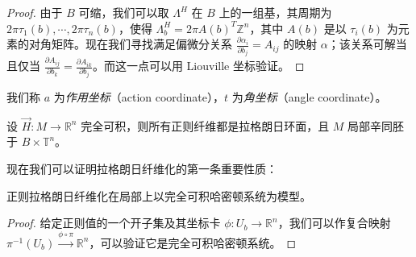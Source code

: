 \begin{proof}
由于 $B$ 可缩，我们可以取 $\Lambda^H$ 在 $B$ 上的一组基，其周期为 $2\pi\tau_1 (b),\dotsb, 2\pi\tau_n (b)$，使得 $\Lambda_b^H =2\pi A(b)^T\mathbb{Z}^n$，其中 $A(b)$ 是以 $\tau_i (b)$ 为元素的对角矩阵。现在我们寻找满足偏微分关系 $\displaystyle\frac{\partial\alpha_i}{\partial b_j}=A_{ij}$ 的映射 $\alpha$；该关系可解当且仅当 $\displaystyle\frac{\partial A_{ij}}{\partial b_k}=\frac{\partial A_{ik}}{\partial b_j}$。而这一点可以用 Liouville 坐标验证。
\end{proof}


我们称 $a$ 为\emph{作用坐标}（action coordinate），$t$ 为\emph{角坐标}（angle coordinate）。


\begin{corollary*}
设 $\vec{H}\colon M\to\mathbb{R}^n$ 完全可积，则所有正则纤维都是拉格朗日环面，且 $M$ 局部辛同胚于 $B\times\mathbb{T}^n$。
\end{corollary*}

现在我们可以证明拉格朗日纤维化的第一条重要性质：

\begin{proposition*}
正则拉格朗日纤维化在局部上以完全可积哈密顿系统为模型。
\end{proposition*}

\begin{proof}
给定正则值的一个开子集及其坐标卡 $\phi\colon U_b\to\mathbb{R}^n$，我们可以作复合映射 $\pi^{-1} (U_b)\xrightarrow{\phi\circ\pi}\mathbb{R}^n$，可以验证它是完全可积哈密顿系统。
\end{proof}


